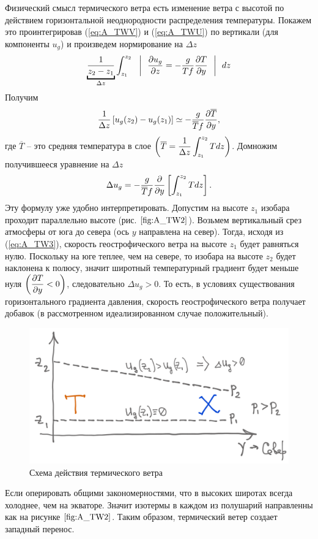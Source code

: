 Физический смысл термического ветра есть изменение ветра с высотой по действием горизонтальной неоднородности распределения температуры. Покажем это проинтегрировав (\ref{eq:A_TWV}) и (\ref{eq:A_TWU}) по вертикали (для компоненты $u_g$) и произведем нормирование на $\Delta z$
\begin{equation*}
    \ub{\frac{1}{z_2-z_1}}_{\Delta z} \int_{z_1}^{z_2} \:\:\:  \bigg| \:\:\: \pd{u_g}{z} =-\frac{g}{Tf}\pd{T}{y} \:\:\: \bigg| \:\:\: dz
\end{equation*}
Получим
\begin{equation*}
    \frac{1}{\Delta z} \displaystyle \left[ u_g(z_2) - u_g(z_1)  \right] \simeq -\frac{g}{\overline{T}f}\displaystyle\frac{\partial \overline{T}}{\partial y},
\end{equation*}
где $\overline{T}$ -- это средняя температура в слое $\displaystyle \left(  \overline{T} = \frac{1}{\Delta z} \int_{z_1}^{z_2} T dz   \right) $. Домножим получившееся уравнение на $\Delta z$ 
\begin{equation}
    \Delta u_g = -\frac{g}{\overline{T}f } \displaystyle\frac{\partial }{\partial y} \displaystyle \left[  \int_{z_1}^{z_2} T dz  \right].
\end{equation}
Эту формулу уже удобно интерпретировать. Допустим на высоте $z_1$ изобара проходит параллельно высоте (рис. $\ref{fig:A_TW2}$). Возьмем вертикальный срез атмосферы от юга до севера (ось $y$ направлена на север). Тогда, исходя из (\ref{eq:A_TW3}), скорость геострофического ветра на высоте $z_1$ будет равняться нулю. Поскольку на юге теплее, чем на севере, то изобара на высоте $z_2$ будет наклонена к полюсу, значит широтный температурный градиент будет меньше нуля $\displaystyle \left(  \displaystyle\frac{\partial T}{\partial y}<0  \right)$, следовательно $\Delta u_g >0$. То есть, в условиях существования горизонтального градиента давления, скорость геострофического ветра получает добавок (в рассмотренном идеализированном случае положительный). 
    \begin{figure}[h]
    \centering
    \includegraphics[width=0.7\linewidth]{pics/A_TW2.png}
    \caption{\label{fig:A_TW2}
    {\color{red} Схема действия термического ветра}
    }
    \end{figure}    
Если оперировать общими закономерностями, что в высоких широтах всегда холоднее, чем на экваторе. Значит изотермы в каждом из полушарий направленны как на рисунке $\ref{fig:A_TW2}$. Таким образом, термический ветер {\color{red} создает} западный перенос. 

